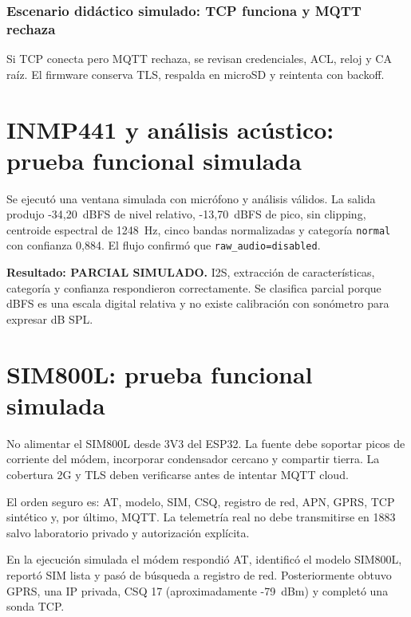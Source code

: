 \documentclass[11pt,a4paper,oneside]{report}
\begin{document}
\subsection*{Escenario didáctico simulado: TCP funciona y MQTT rechaza}
Si TCP conecta pero MQTT rechaza, se revisan credenciales, ACL, reloj y CA raíz. El
firmware conserva TLS, respalda en microSD y reintenta con backoff.

\chapter{INMP441 y análisis acústico: prueba funcional simulada}

Se ejecutó una ventana simulada con micrófono y análisis válidos. La salida produjo
-34,20~dBFS de nivel relativo, -13,70~dBFS de pico, sin clipping, centroide espectral
de 1248~Hz, cinco bandas normalizadas y categoría \texttt{normal} con confianza 0,884.
El flujo confirmó que \texttt{raw\_audio=disabled}.


\begin{vssimtest}
\textbf{Resultado: PARCIAL SIMULADO.} I2S, extracción de características, categoría y
confianza respondieron correctamente. Se clasifica parcial porque dBFS es una escala
digital relativa y no existe calibración con sonómetro para expresar dB SPL.
\end{vssimtest}

\chapter{SIM800L: prueba funcional simulada}

\begin{vswarning}
No alimentar el SIM800L desde 3V3 del ESP32. La fuente debe soportar picos de corriente
del módem, incorporar condensador cercano y compartir tierra. La cobertura 2G y TLS
deben verificarse antes de intentar MQTT cloud.
\end{vswarning}

El orden seguro es: AT, modelo, SIM, CSQ, registro de red, APN, GPRS, TCP sintético y,
por último, MQTT. La telemetría real no debe transmitirse en 1883 salvo laboratorio
privado y autorización explícita.

En la ejecución simulada el módem respondió AT, identificó el modelo SIM800L, reportó
SIM lista y pasó de búsqueda a registro de red. Posteriormente obtuvo GPRS, una IP
privada, CSQ 17 (aproximadamente -79~dBm) y completó una sonda TCP.
\end{document}
